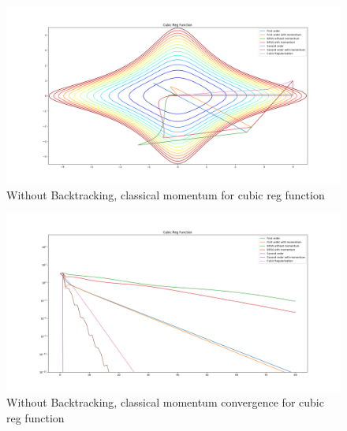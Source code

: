 \documentclass{article}
\begin{document}
\begin{center}
\begin{figure}[H]
	\includegraphics[width=\linewidth]{../Images/cubicregularizationmomentum.png}
	\caption{Without Backtracking, classical momentum for cubic reg function}
	\label{fig:Without Backtracking, classical momentum for cubic reg function}
\end{figure}

\begin{figure}[H]
	\includegraphics[width=\linewidth]{../Images/cubicregularizationmomentum1.png}
	\caption{Without Backtracking, classical momentum convergence for cubic reg function}
	\label{fig:Without Backtracking, classical momentum convergence for cubic reg function}
\end{figure}


\end{center}
\end{document}
